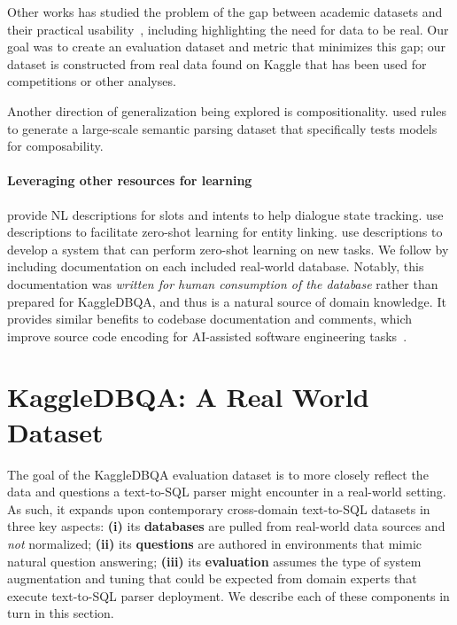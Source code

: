 \documentclass[11pt,a4paper]{article}
\newcommand{\systemname}{\mbox{KaggleDBQA}\xspace}
\begin{document}
Other works has studied the problem of the gap between academic datasets and their practical
usability~\cite{de2020towards,radhakrishnan2020colloql,zhang2020did}, including highlighting the need for data to be real.
Our goal was to create an evaluation dataset and metric that minimizes this gap; our dataset is constructed from real data
found on Kaggle that has been used for competitions or other analyses.

Another direction of generalization being explored is compositionality.
\citet{keysers2019measuring} used rules to generate a large-scale semantic parsing dataset that specifically tests models for
composability. 

\paragraph{Leveraging other resources for learning}
\citet{rastogi2020towards} provide NL descriptions for slots and intents to help dialogue state tracking.
\citet{logeswaran2019zero} use descriptions to facilitate zero-shot learning for entity linking.
\citet{weller2020learning} use descriptions to develop a system that can perform zero-shot learning on new tasks.
We follow by including documentation on each included real-world database.
Notably, this documentation was \emph{written for human consumption of the database} rather than prepared for
\systemname, and thus is a natural source of domain knowledge.
It provides similar benefits to codebase documentation and comments, which improve source code
encoding for AI-assisted software engineering tasks~\cite{panthaplackel2020associating,wei2019code}.

 \section{\systemname: A Real World Dataset}
\label{sec:dataset}

The goal of the \systemname evaluation dataset is to more closely reflect the data and questions a text-to-SQL
parser might encounter in a real-world setting.
As such, it expands upon contemporary cross-domain text-to-SQL datasets in three key aspects:
\textbf{(i)} its \textbf{databases} are pulled from real-world data sources and \emph{not} normalized;
\textbf{(ii)} its \textbf{questions} are authored in environments that mimic natural question answering;
\textbf{(iii)} its \textbf{evaluation} assumes the type of system augmentation and tuning that could be expected from
domain experts that execute text-to-SQL parser deployment.
We describe each of these components in turn in this section.
\end{document}
